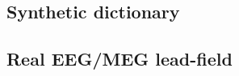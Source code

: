 \subsection{Synthetic dictionary}
\label{sec:Artificial simulated dictionary} 

\subsection{Real EEG/MEG lead-field}
\label{sec:Real EEG/MEG leadfield} 
